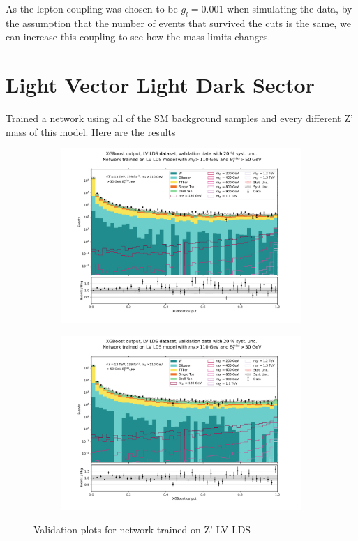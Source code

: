 \documentclass[12pt, a4paper]{book}
\begin{document}
As the lepton coupling was chosen to be $g_l=0.001$ when simulating the data, by the assumption that the number of events that survived the cuts is the same, we can increase this coupling to see how the mass limits changes.

\clearpage
\section{Light Vector Light Dark Sector}Trained a network using all of the SM background samples and every different Z' mass of this model. Here are the results
\begin{figure}[!ht]
	\centering
	\begin{subfigure}[b]{0.49\textwidth}
      \centering
      \includegraphics[width=1\textwidth]{XGBoost/LV_LDS/VAL_ee.pdf}
      \end{subfigure}
   \hfill
   \begin{subfigure}[b]{0.49\textwidth}
      \centering
      \includegraphics[width=1\textwidth]{XGBoost/LV_LDS/VAL_uu.pdf}
      \end{subfigure}
   \caption{Validation plots for network trained on Z' LV LDS}\label{fig:LV_LDS_vals}
\end{figure}
\end{document}
